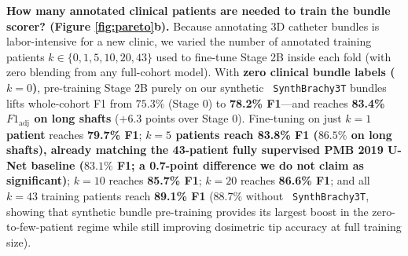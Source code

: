 \documentclass[
  11pt,
]{article}
\let\nforigtexttt\texttt
\renewcommand{\texttt}[1]{\nforigtexttt{\XeTeXinterchartokenstate=1 #1}}
\begin{document}
\textbf{How many annotated clinical patients are needed to train the
bundle scorer? (Figure \ref{fig:pareto}b).} Because annotating 3D
catheter bundles is labor-intensive for a new clinic, we varied the
number of annotated training patients \(k \in \{0, 1, 5, 10, 20, 43\}\)
used to fine-tune Stage 2B inside each fold (with zero blending from any
full-cohort model). With \textbf{zero clinical bundle labels
(\(k = 0\))}, pre-training Stage 2B purely on our synthetic
\texttt{SynthBrachy3T} bundles lifts whole-cohort F1 from \(75.3\%\)
(Stage 0) to \textbf{78.2\% F1}---and reaches \textbf{83.4\%
\(F1_{\text{adj}}\) on long shafts} (\(+6.3\) points over Stage 0).
Fine-tuning on just \textbf{\(k = 1\) patient} reaches \textbf{79.7\%
F1}; \textbf{\(k = 5\) patients reach 83.8\% F1 (\(86.5\%\) on long
shafts), already matching the 43-patient fully supervised PMB 2019 U-Net
baseline (\(83.1\%\) F1; a 0.7-point difference we do not claim as
significant)}; \(k = 10\) reaches \textbf{85.7\% F1}; \(k = 20\) reaches
\textbf{86.6\% F1}; and all \(k = 43\) training patients reach
\textbf{89.1\% F1} (\(88.7\%\) without \texttt{SynthBrachy3T}, showing
that synthetic bundle pre-training provides its largest boost in the
zero-to-few-patient regime while still improving dosimetric tip accuracy
at full training size).
\end{document}
